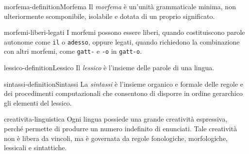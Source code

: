\documentclass[preview]{standalone}
\begin{document}
\begin{snippetdefinition}{morfema-definition}{Morfema}
    Il \emph{morfema} è un'unità grammaticale minima, non ulteriormente
    scomponibile, isolabile e dotata di un proprio significato.
\end{snippetdefinition}

\begin{snippet}{morfemi-liberi-legati}
    I morfemi possono essere liberi, quando costituiscono parole autonome come
    \texttt{il} o \texttt{adesso}, oppure legati, quando richiedono la
    combinazione con altri morfemi, come \texttt{gatt-} e \texttt{-o} in
    \texttt{gatt-o}.
\end{snippet}

\begin{snippetdefinition}{lessico-definition}{Lessico}
    Il \emph{lessico} è l'insieme delle parole di una lingua.
\end{snippetdefinition}

\begin{snippetdefinition}{sintassi-definition}{Sintassi}
    La \emph{sintassi} è l'insieme organico e formale delle regole e dei
    procedimenti computazionali che consentono di disporre in ordine gerarchico
    gli elementi del lessico.
\end{snippetdefinition}

\begin{snippet}{creativita-linguistica}
    Ogni lingua possiede una grande creatività espressiva, perché permette di
    produrre un numero indefinito di enunciati. Tale creatività non è libera da
    vincoli, ma è governata da regole fonologiche, morfologiche, lessicali e
    sintattiche.
\end{snippet}
\end{document}
